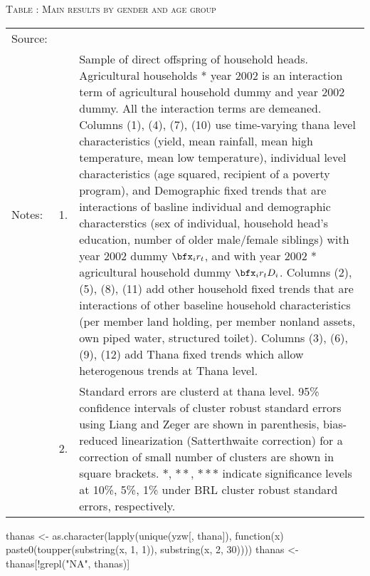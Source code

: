 \begin{table}
\hfil\textsc{\footnotesize Table \thetable: Main results by gender and age group\label{MainGenderAgeGroup2ResultsWithInteractions}}\\
\setlength{\tabcolsep}{1pt}
\renewcommand{\arraystretch}{.55}
\hspace{-1cm}

\renewcommand{\arraystretch}{1}
\hfil\begin{tabular}{>{\hfill\scriptsize}p{1cm}<{}>{\hfill\scriptsize}p{.5cm}<{}>{\scriptsize}p{12cm}<{\hfill}}
Source:& \multicolumn{2}{l}{\scriptsize Compiled from IFPRI data. }\\[-1ex]
Notes:& 1. & Sample of direct offspring of household heads. \textsf{Agricultural households * year 2002} is an interaction term of agricultural household dummy and year 2002 dummy. All the interaction terms are demeaned. Columns \textsf{(1), (4), (7), (10)} use time-varying thana level characteristics (yield, mean rainfall, mean high temperature, mean low temperature), individual level characteristics (age squared, recipient of a poverty program), and \textsf{Demographic fixed trends} that are interactions of basline individual and demographic characterstics (sex of individual, household head's education, number of older male/female siblings) with year 2002 dummy $\bfx_{i}r_{t}$, and with year 2002 * agricultural household dummy $\bfx_{i}r_{t}D_{i}$. Columns \textsf{(2), (5), (8), (11)} add \textsf{other household fixed trends} that are interactions of other baseline household characteristics (per member land holding, per member nonland assets, own piped water, structured toilet). Columns \textsf{(3), (6), (9), (12)} add \textsf{Thana fixed trends} which allow heterogenous trends at Thana level. \\[-1ex]
& 2. & Standard errors are clusterd at thana level. 95\% confidence intervals of cluster robust standard errors using Liang and Zeger are shown in parenthesis, bias-reduced linearization (Satterthwaite correction) for a correction of small number of clusters are shown in square brackets. $*$, $**$, $***$ indicate significance levels at 10\%, 5\%, 1\% under BRL cluster robust standard errors, respectively.
\end{tabular}
\end{table}


\begin{Schunk}
\begin{Sinput}
thanas <- as.character(lapply(unique(yzw[, thana]), function(x) 
  paste0(toupper(substring(x, 1, 1)), substring(x, 2, 30))))
thanas <- thanas[!grepl("NA", thanas)]
\end{Sinput}
\end{Schunk}

